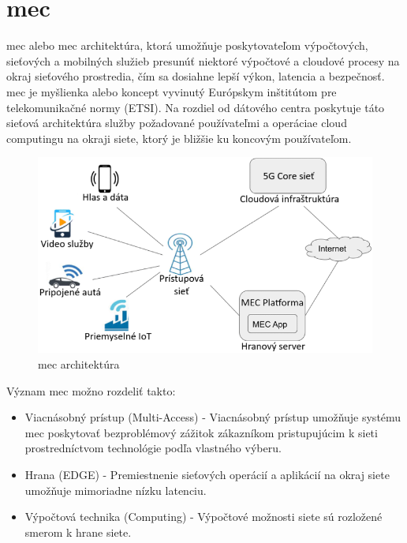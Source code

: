 \section{\acrfull{mec}}

\acrlong{mec} alebo \acrshort{mec} architektúra, ktorá umožňuje poskytovateľom výpočtových, sieťových a mobilných služieb presunúť niektoré výpočtové a cloudové procesy na okraj sieťového prostredia, čím sa dosiahne lepší výkon, latencia a bezpečnosť.
\acrfull{mec} je myšlienka alebo koncept vyvinutý Európskym inštitútom pre telekomunikačné normy (ETSI).
Na rozdiel od dátového centra poskytuje táto sieťová architektúra služby požadované používateľmi a operáciae cloud computingu na okraji siete, ktorý je bližšie ku koncovým používateľom. \cite{mec}

\begin{figure}[H]
    \centering
    \includegraphics[width=1\linewidth]{figures/MEC.png}
    \caption{\acrfull{mec} architektúra \label{mec}}
    \label{fig:enter-label}
\end{figure}

Význam \acrshort{mec} možno rozdeliť takto:

\begin{itemize}

    \item Viacnásobný prístup (Multi-Access) - Viacnásobný prístup umožňuje systému \acrshort{mec} poskytovať bezproblémový zážitok zákazníkom pristupujúcim k sieti prostredníctvom technológie podľa vlastného výberu.
    \item Hrana (EDGE) - Premiestnenie sieťových operácií a aplikácií na okraj siete umožňuje mimoriadne nízku latenciu.
    \item Výpočtová technika (Computing) - Výpočtové možnosti siete sú rozložené smerom k hrane siete.

\end{itemize}

